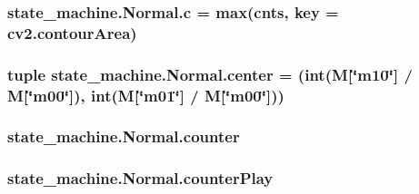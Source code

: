 \subsubsection[{\texorpdfstring{c}{c}}]{\setlength{\rightskip}{0pt plus 5cm}state\+\_\+machine.\+Normal.\+c = max(cnts, key = cv2.\+contour\+Area)\hspace{0.3cm}{\ttfamily [static]}}\hypertarget{classstate__machine_1_1Normal_a9e0c7641755e2614e74b3228fbef0a82}{}\label{classstate__machine_1_1Normal_a9e0c7641755e2614e74b3228fbef0a82}
\subsubsection[{\texorpdfstring{center}{center}}]{\setlength{\rightskip}{0pt plus 5cm}tuple state\+\_\+machine.\+Normal.\+center = (int({\bf M}\mbox{[}\char`\"{}m10\char`\"{}\mbox{]} / M\mbox{[}\char`\"{}m00\char`\"{}\mbox{]}), int({\bf M}\mbox{[}\char`\"{}m01\char`\"{}\mbox{]} / M\mbox{[}\char`\"{}m00\char`\"{}\mbox{]}))\hspace{0.3cm}{\ttfamily [static]}}\hypertarget{classstate__machine_1_1Normal_a91a5741f842196647b0f7267ce568aeb}{}\label{classstate__machine_1_1Normal_a91a5741f842196647b0f7267ce568aeb}
\subsubsection[{\texorpdfstring{counter}{counter}}]{\setlength{\rightskip}{0pt plus 5cm}state\+\_\+machine.\+Normal.\+counter\hspace{0.3cm}{\ttfamily [static]}}\hypertarget{classstate__machine_1_1Normal_ad631fe332b431c0001682701dde8dbed}{}\label{classstate__machine_1_1Normal_ad631fe332b431c0001682701dde8dbed}
\subsubsection[{\texorpdfstring{counter\+Play}{counterPlay}}]{\setlength{\rightskip}{0pt plus 5cm}state\+\_\+machine.\+Normal.\+counter\+Play\hspace{0.3cm}{\ttfamily [static]}}\hypertarget{classstate__machine_1_1Normal_ad9306b3db821d9634339a20308e48a25}{}\label{classstate__machine_1_1Normal_ad9306b3db821d9634339a20308e48a25}


